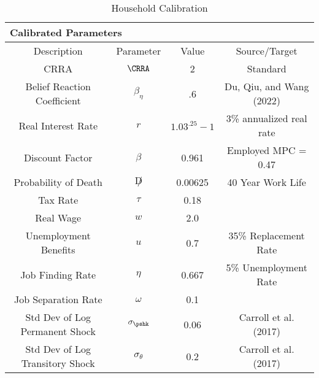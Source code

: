 \begin{table}
\begin{center}\renewcommand{\arraystretch}{1.5}
\caption{Household Calibration}\label{table:Calibration}
\begin{tabular}{|c|ccl|c|}
\hline
\multicolumn{5}{|l|}{Calibrated Parameters}  \\ \hline
Description                     & \multicolumn{1}{c}{Parameter} & Value & \multicolumn{2}{c|}{Source/Target }\\ \hline
CRRA & \multicolumn{1}{c}{$\CRRA$} & 2 & \multicolumn{2}{c|}{Standard} \\
Belief Reaction Coefficient   & \multicolumn{1}{c}{$\beta_{\eta}$} & .6 & \multicolumn{2}{c|}{Du, Qiu, and Wang (2022) } \\
Real Interest Rate                 & \multicolumn{1}{c}{$r$} & $1.03^{.25} - 1$ & \multicolumn{2}{c|}{ 3\% annualized real rate} \\
Discount Factor          & \multicolumn{1}{c}{$\beta$} & 0.961 & \multicolumn{2}{c|}{Employed MPC = 0.47 } \\
Probability of Death       & \multicolumn{1}{c}{$\not D$} & 0.00625 & \multicolumn{2}{c|}{40 Year Work Life} \\
Tax Rate       & \multicolumn{1}{c}{$\tau$} & 0.18 & \multicolumn{2}{c|}{} \\
Real Wage & \multicolumn{1}{c}{$w$} & 2.0 & \multicolumn{2}{c|}{} \\
Unemployment Benefits & \multicolumn{1}{c}{$u$} & 0.7 & \multicolumn{2}{c|}{ 35\% Replacement Rate} \\
Job Finding Rate & \multicolumn{1}{c}{$\eta$} & 0.667 & \multicolumn{2}{c|}{ 5\% Unemployment Rate} \\
Job Separation Rate & \multicolumn{1}{c}{$\omega$} & 0.1 & \multicolumn{2}{c|}{\cite{Graves2022}} \\
Std Dev of Log Permanent Shock  & \multicolumn{1}{c}{$\sigma_{\pshk}$} & 0.06 & \multicolumn{2}{c|}{Carroll et al. (2017)} \\
Std Dev of Log Transitory Shock & \multicolumn{1}{c}{$\sigma_{\theta}$} & 0.2 & \multicolumn{2}{c|}{Carroll et al. (2017)} \\ \hline
\end{tabular}
\end{center}
\end{table}
